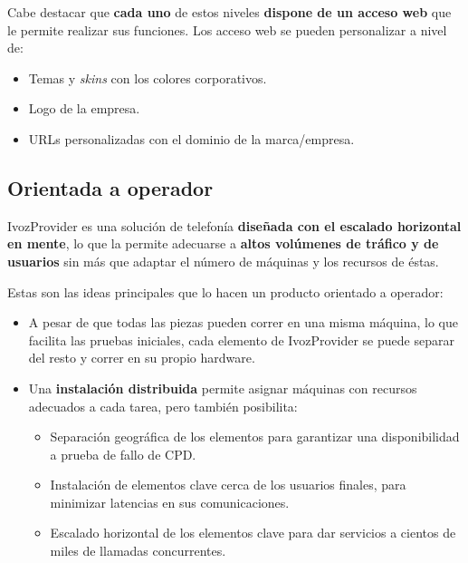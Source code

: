 \documentclass[letterpaper,10pt,spanish]{sphinxmanual}
\begin{document}
Cabe destacar que \textbf{cada uno} de estos niveles \textbf{dispone de un acceso web} que le permite realizar sus funciones. Los acceso web se pueden personalizar a nivel de:
\begin{itemize}
\item {} 
Temas y \emph{skins} con los colores corporativos.

\item {} 
Logo de la empresa.

\item {} 
URLs personalizadas con el dominio de la marca/empresa.

\end{itemize}


\subsection{Orientada a operador}
\label{intro/what_is_ivozprovider:operator-oriented}\label{intro/what_is_ivozprovider:orientada-a-operador}
IvozProvider es una solución de telefonía \textbf{diseñada con el escalado horizontal en mente}, lo que la permite adecuarse a \textbf{altos volúmenes de tráfico y de usuarios} sin más que adaptar el número de máquinas y los recursos de éstas.

Estas son las ideas principales que lo hacen un producto orientado a operador:
\begin{itemize}
\item {} 
A pesar de que todas las piezas pueden correr en una misma máquina, lo que facilita las pruebas iniciales, cada elemento de IvozProvider se puede separar del resto y correr en su propio hardware.

\item {} 
Una \textbf{instalación distribuida} permite asignar máquinas con recursos adecuados a cada tarea, pero también posibilita:
\begin{itemize}
\item {} 
Separación geográfica de los elementos para garantizar una disponibilidad a prueba de fallo de CPD.

\item {} 
Instalación de elementos clave cerca de los usuarios finales, para minimizar latencias en sus comunicaciones.

\item {} 
Escalado horizontal de los elementos clave para dar servicios a cientos de miles de llamadas concurrentes.

\end{itemize}

\end{itemize}
\end{document}
